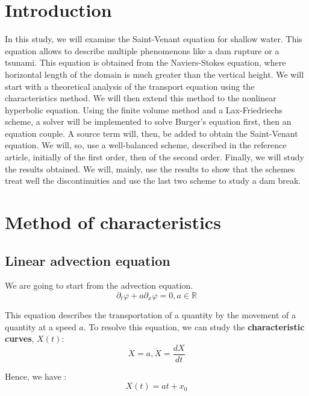 \section*{Introduction}
    In this study, we will examine the Saint-Venant equation for shallow water. This equation allows to describe multiple phenomenons like a dam rupture or a tsunami. This equation is obtained from the Naviers-Stokes equation, where horizontal length of the domain is much greater than the vertical height.
    We will start with a theoretical analysis of the transport equation using the characteristics method. We will then extend this method to the nonlinear hyperbolic equation. Using the finite volume method and a Lax-Friedriechs scheme, a solver will be implemented to solve Burger's equation first, then an  equation couple. A source term will, then, be added to obtain the Saint-Venant equation. We will, so, use a well-balanced scheme, described in the reference article, initially of the first order, then of the second order. Finally, we will study the results obtained. We will, mainly, use the results to show that the schemes treat well the discontinuities and  use the last two scheme to study a dam break.


\newpage

\section{Method of characteristics}
    \subsection{Linear advection equation}
        We are going to start from the advection  equation.
        \begin{equation}
            \partial_t\varphi+ a\partial_x\varphi = 0, a \in \mathds{R}
        \end{equation}

        This equation describes the transportation of a quantity by the movement of a quantity at a speed $ a $. To resolve this equation, we can study the \textbf{characteristic curves}, $ X\left(t\right)$:
        \begin{equation}
            \dot X = a, \dot X=\frac{dX}{dt}
        \end{equation}

        Hence, we have :
        \begin{equation*}
            X\left(t\right) = at + x_0
        \end{equation*}


